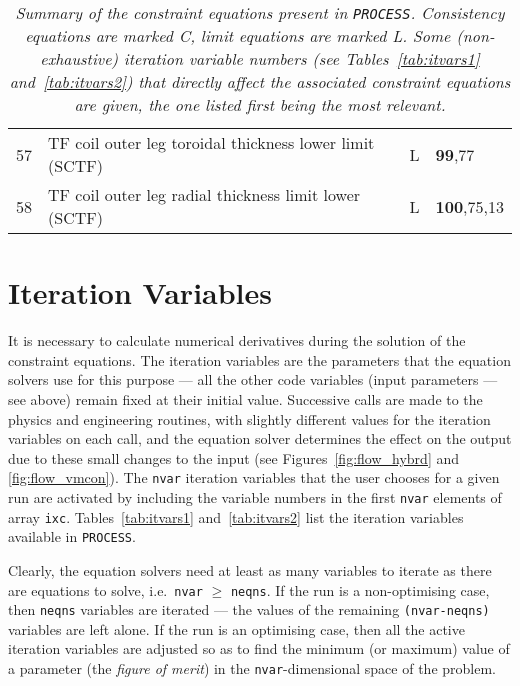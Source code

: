 \documentclass[11pt,a4paper]{report}
\newcommand{\process}{\mbox{\texttt{PROCESS}}}
\begin{document}
\begin{table}[tbph]
\begin{center}
\begin{tabular}{||c|l|c|l||}
57  & TF coil outer leg toroidal thickness lower limit (SCTF)   & L    & \textbf{99},77 \\
58  & TF coil outer leg radial thickness limit lower (SCTF)     & L    & \textbf{100},75,13 \\
\hline
\end{tabular}
\end{center}
\caption[List of constraint equations]
{\label{tab:eqns}
  \textit{Summary of the constraint equations present in \process. Consistency
    equations are marked C, limit equations are marked L\@. Some
    (non-exhaustive) iteration variable numbers (see Tables~\ref{tab:itvars1}
    and~\ref{tab:itvars2}) that directly affect the associated constraint
    equations are given, the one listed first being the most relevant.}
}
\normalsize
\end{table}

\section{Iteration Variables}
\label{sec:itvars}

It is necessary to calculate numerical derivatives during the solution of the
constraint equations. The iteration variables are the parameters that the
equation solvers use for this purpose --- all the other code variables (input
parameters --- see above) remain fixed at their initial value. Successive
calls are made to the physics and engineering routines, with slightly
different values for the iteration variables on each call, and the equation
solver determines the effect on the output due to these small changes to the
input (see Figures~\ref{fig:flow_hybrd} and \ref{fig:flow_vmcon}). The
\texttt{nvar} iteration variables that the user chooses for a given run are
activated by including the variable numbers in the first \texttt{nvar}
elements of array \texttt{ixc}. Tables~\ref{tab:itvars1} and~\ref{tab:itvars2}
list the iteration variables available in \process.

Clearly, the equation solvers need at least as many variables to iterate as
there are equations to solve, i.e.\ \texttt{nvar} $\geq$ \texttt{neqns}. If
the run is a non-optimising case, then \texttt{neqns} variables are iterated
--- the values of the remaining \texttt{(nvar-neqns)} variables are left
alone. If the run is an optimising case, then all the active iteration
variables are adjusted so as to find the minimum (or maximum) value of a
parameter (the \textit{ figure of merit}) in the \texttt{nvar}-dimensional
space of the problem.
\end{document}
